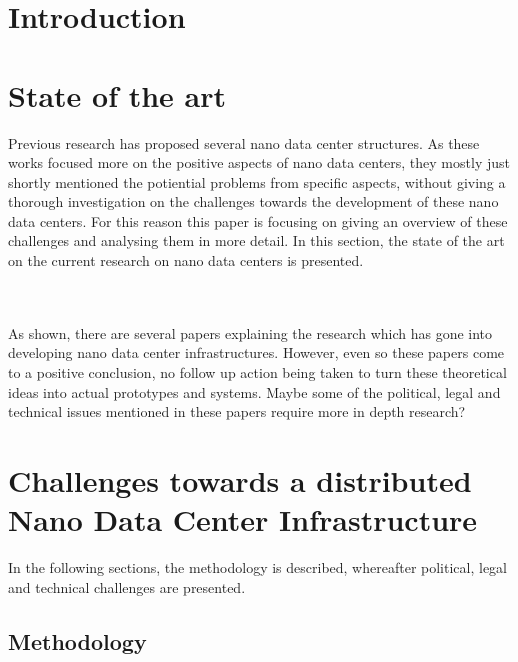 
\section{Introduction}


\section{State of the art}
\label{StateOfTheArt}
Previous research has proposed several nano data center structures. As these works focused more on the positive aspects of nano data centers, they mostly just shortly mentioned the potiential problems from specific aspects, without giving a thorough investigation on the challenges towards the development of these nano data centers. For this reason this paper is focusing on giving an overview of these challenges and analysing them in more detail. In this section, the state of the art on the current research on nano data centers is presented. 



\\ \\
As shown, there are several papers explaining the research which has gone into developing nano data center infrastructures. However, even so these papers come to a positive conclusion, no follow up action being taken to turn these theoretical ideas into actual prototypes and systems. Maybe some of the political, legal and technical issues mentioned in these papers require more in depth research?

\section{Challenges towards a distributed Nano Data Center Infrastructure}
\label{sec:challenges}
In the following sections, the methodology is described, whereafter political, legal and technical challenges are presented.

\subsection{Methodology}



